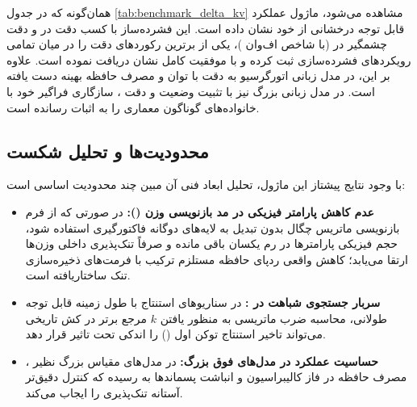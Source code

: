 همان‌گونه که در جدول \ref{tab:benchmark_delta_kv} مشاهده می‌شود، ماژول  عملکرد قابل توجه درخشانی از خود نشان داده است. این فشرده‌ساز با کسب دقت  در  و دقت چشمگیر  در  (با شاخص اف‌وان )، یکی از برترین رکوردهای دقت را در میان تمامی رویکردهای فشرده‌سازی ثبت کرده و با موفقیت کامل نشان  دریافت نموده است. علاوه بر این، در مدل زبانی اتورگرسیو  به دقت  با توان  و مصرف حافظه بهینه  دست یافته است. در مدل زبانی بزرگ  نیز با تثبیت وضعیت  و دقت ، سازگاری فراگیر خود با خانواده‌های گوناگون معماری را به اثبات رسانده است.

\subsection{محدودیت‌ها و تحلیل شکست}
با وجود نتایج پیشتاز این ماژول، تحلیل ابعاد فنی آن مبین چند محدودیت اساسی است:
\begin{itemize}
    \item \textbf{عدم کاهش پارامتر فیزیکی در مد بازنویسی وزن ():} در صورتی که از فرم بازنویسی ماتریس چگال بدون تبدیل به لایه‌های دوگانه فاکتورگیری استفاده شود، حجم فیزیکی پارامترها در رم یکسان باقی مانده و صرفاً تنک‌پذیری داخلی وزن‌ها ارتقا می‌یابد؛ کاهش واقعی ردپای حافظه مستلزم ترکیب با فرمت‌های ذخیره‌سازی تنک ساختاریافته است.
    \item \textbf{سربار جستجوی شباهت در :} در سناریوهای استنتاج با طول زمینه قابل توجه طولانی، محاسبه ضرب ماتریسی به منظور یافتن $k$ مرجع برتر در کش تاریخی می‌تواند تاخیر استنتاج توکن اول () را اندکی تحت تاثیر قرار دهد.
    \item \textbf{حساسیت عملکرد در مدل‌های فوق بزرگ:} در مدل‌های مقیاس بزرگ نظیر ، مصرف حافظه در فاز کالیبراسیون و انباشت پسماندها به  رسیده که کنترل دقیق‌تر آستانه تنک‌پذیری را ایجاب می‌کند.
\end{itemize}
